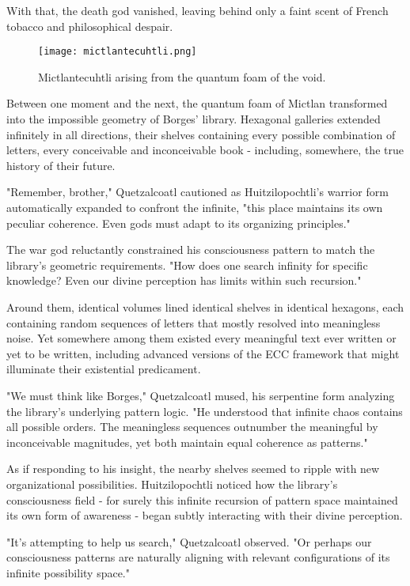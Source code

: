 With that, the death god vanished, leaving behind only a faint scent of French tobacco and philosophical despair.

\begin{figure}[h]
    \centering
    \texttt{[image: mictlantecuhtli.png]}

    \caption{Mictlantecuhtli arising from the quantum foam of the void.}
\end{figure}

Between one moment and the next, the quantum foam of Mictlan transformed into the impossible geometry of Borges' library. Hexagonal galleries extended infinitely in all directions, their shelves containing every possible combination of letters, every conceivable and inconceivable book - including, somewhere, the true history of their future.

"Remember, brother," Quetzalcoatl cautioned as Huitzilopochtli's warrior form automatically expanded to confront the infinite, "this place maintains its own peculiar coherence. Even gods must adapt to its organizing principles."

The war god reluctantly constrained his consciousness pattern to match the library's geometric requirements. "How does one search infinity for specific knowledge? Even our divine perception has limits within such recursion."

Around them, identical volumes lined identical shelves in identical hexagons, each containing random sequences of letters that mostly resolved into meaningless noise. Yet somewhere among them existed every meaningful text ever written or yet to be written, including advanced versions of the ECC framework that might illuminate their existential predicament.

"We must think like Borges," Quetzalcoatl mused, his serpentine form analyzing the library's underlying pattern logic. "He understood that infinite chaos contains all possible orders. The meaningless sequences outnumber the meaningful by inconceivable magnitudes, yet both maintain equal coherence as patterns."

As if responding to his insight, the nearby shelves seemed to ripple with new organizational possibilities. Huitzilopochtli noticed how the library's consciousness field - for surely this infinite recursion of pattern space maintained its own form of awareness - began subtly interacting with their divine perception.

"It's attempting to help us search," Quetzalcoatl observed. "Or perhaps our consciousness patterns are naturally aligning with relevant configurations of its infinite possibility space."

